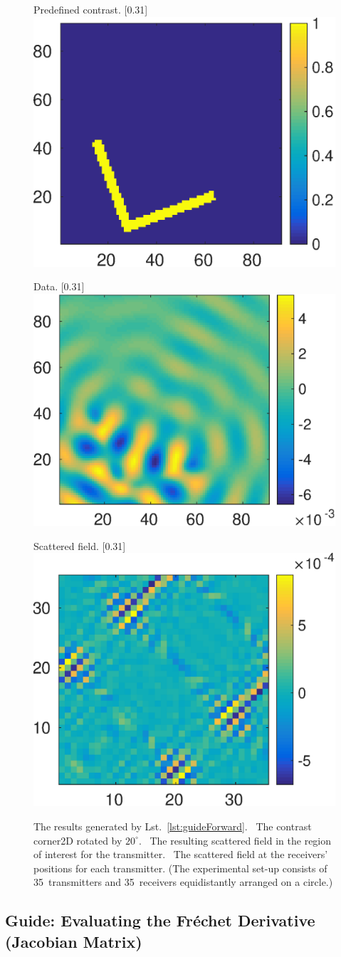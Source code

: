 \documentclass[a4paper]{article}
\begin{document}
\begin{figure}
\centering
\begin{subcaptionbox}{Predefined contrast.
  \label{fig:guide:forward1}}[0.31\textwidth]{
  \includegraphics[height=0.21\textwidth]{figs/fig_guideForward1}
  }
\end{subcaptionbox}
\begin{subcaptionbox}{Data.
  \label{fig:guide:forward2}}[0.31\textwidth]{
  \includegraphics[height=0.21\textwidth]{figs/fig_guideForward2}
  }
\end{subcaptionbox}
\begin{subcaptionbox}{Scattered field.
  \label{fig:guide:forward3}}[0.31\textwidth]{
  \includegraphics[height=0.23\textwidth]{figs/fig_guideForward3}
  }
\end{subcaptionbox}
\caption{The results generated by Lst.~\ref{lst:guideForward}. 
~The contrast \textsf{corner2D} rotated by $20^\circ$. ~The resulting scattered field in the region of interest for the  transmitter. 
~The scattered field at the receivers' positions for each transmitter. (The experimental set-up consists of 35~transmitters and 35~receivers equidistantly arranged on a circle.)}
\label{fig:guide:forward}
\end{figure}


\subsection{Guide: Evaluating the Fr\'echet Derivative (Jacobian Matrix)}\label{sec:guide:derivative}
\end{document}
